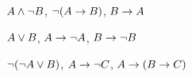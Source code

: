 \begin{compactlist}
\item $A \wedge \neg B$, $\neg(A \rightarrow B)$, $B \rightarrow A$\vspace{.5ex} %


\item $A \vee B$, $A \rightarrow \neg A$, $B \rightarrow \neg B$ \vspace{.5ex}%


\item $\neg(\neg A \vee B) $, $A \rightarrow \neg C$, $A \rightarrow (B \rightarrow C)$\vspace{.5ex} %


\end{compactlist}
